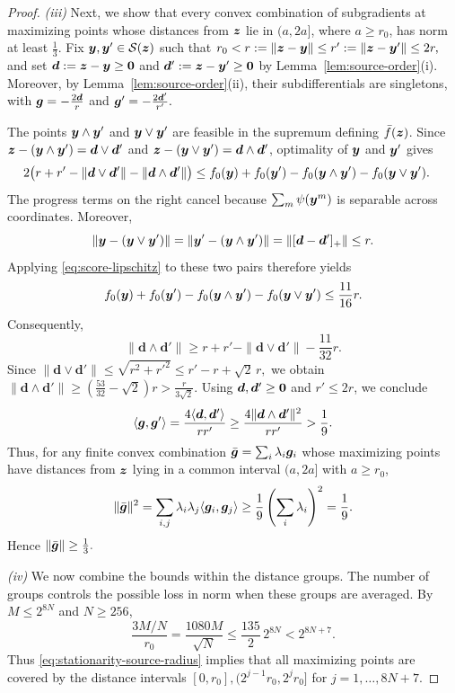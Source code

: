 \begin{proof}
\emph{(iii)}
Next, we show that every convex combination of subgradients
at maximizing points whose distances from $\bm{z}$
lie in $(a,2a]$, where $a\ge r_0$,
has norm at least $\tfrac13$.
Fix $\bm{y},\bm{y}'\in\mathcal S(\bm{z})$ such that
$
 r_0<r:=\|\bm{z}-\bm{y}\|
 \le r':=\|\bm{z}-\bm{y}'\|\le2r,
$ 
and set $\bm d:=\bm{z}-\bm{y}\ge{\mathbf 0}$ and
$\bm d':=\bm{z}-\bm{y}'\ge{\mathbf 0}$ by Lemma~\ref{lem:source-order}(i). 
Moreover, by Lemma~\ref{lem:source-order}(ii), their
subdifferentials are singletons, with
$
 \bm{g}=-\tfrac{2\bm d}{r}$ and 
$\bm{g}'=-\tfrac{2\bm d'}{r'}.
$ 

The points $\bm{y}\wedge\bm{y}'$ and $\bm{y}\vee\bm{y}'$ are
feasible in the supremum defining $\bar f(\bm{z})$.
Since $\bm{z}-(\bm{y}\wedge\bm{y}')=\bm d\vee\bm d'$ and $\bm{z}-(\bm{y}\vee\bm{y}')=\bm d\wedge\bm d'$,
optimality of $\bm{y}$ and $\bm{y}'$ gives
\[
\begin{aligned}
 &2\bigl(
 r+r'
 -\|\bm d\vee\bm d'\|
 -\|\bm d\wedge\bm d'\|
 \bigr)\le
 f_0(\bm{y})+f_0(\bm{y}')
 -f_0(\bm{y}\wedge\bm{y}')-f_0(\bm{y}\vee\bm{y}').
\end{aligned}
\]
The progress terms on the right cancel because
$\sum_m\psi(\bm{y}^m)$ is separable across coordinates.
Moreover,
\[
 \|\bm{y}-(\bm{y}\vee\bm{y}')\|
 =
 \|\bm{y}'-(\bm{y}\wedge\bm{y}')\|
 =
 \|[\bm d-\bm d']_+\|
 \le r.
\]
Applying \eqref{eq:score-lipschitz} to these two
pairs therefore yields
\[
 f_0(\bm{y})+f_0(\bm{y}')
 -f_0(\bm{y}\wedge\bm{y}')-f_0(\bm{y}\vee\bm{y}')
 \le\frac{11}{16}r.
\]
Consequently,
\[
 \|\bm d\wedge\bm d'\|
 \ge r+r'-\|\bm d\vee\bm d'\|-\frac{11}{32}r.
\]
Since
$ \|\bm d\vee\bm d'\|
 \le\sqrt{r^2+r'^2}
 \le r'-r+\sqrt2\,r,
$ 
we obtain
$
 \|\bm d\wedge\bm d'\|
 \ge(\tfrac{53}{32}-\sqrt2)r
 >\tfrac{r}{3\sqrt2}.
$
Using $\bm d,\bm d'\ge{\mathbf 0}$ and $r'\le2r$, we conclude
\[
 \langle\bm{g},\bm{g}'\rangle
 =
 \frac{4\langle\bm d,\bm d'\rangle}{rr'}
 \ge
 \frac{4\|\bm d\wedge\bm d'\|^2}{rr'}
 >\frac19.
\]
Thus, for any finite convex combination
$\bar{\bm{g}}=\sum_i\lambda_i\bm{g}_i$
whose maximizing points have distances from $\bm{z}$
lying in a common interval $(a,2a]$ with $a\ge r_0$,
\[
 \|\bar{\bm{g}}\|^2
 =
 \sum_{i,j}\lambda_i\lambda_j
 \langle\bm{g}_i,\bm{g}_j\rangle
 \ge\frac19
 \left(\sum_i\lambda_i\right)^2
 =\frac19.
\]
Hence $\|\bar{\bm{g}}\|\ge\frac13.$

\emph{(iv) } We now combine the bounds within the distance groups. The number
of groups controls the possible loss in norm when these groups are averaged.
By $M\le2^{8N}$ and $N\ge256$,
\[
 \frac{3M/N}{r_0}
 =\frac{1080M}{\sqrt N}
 \le\frac{135}{2}\,2^{8N}
 <2^{8N+7}.
\]
Thus \eqref{eq:stationarity-source-radius} implies
that all maximizing points are covered by the
distance intervals $[0,r_0],(2^{j-1}r_0,2^jr_0]$ for $j=1,\ldots,8N+7$.


\end{proof}
